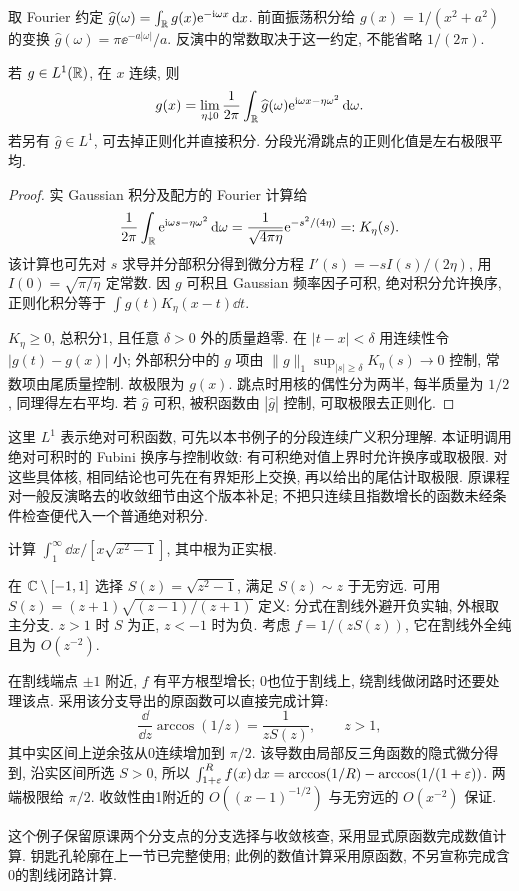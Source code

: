 取 Fourier 约定 $\widehat g(\omega)=\int_\mathbb R g(x)\mathrm e^{-\mathrm i\omega x}\,\mathrm d x$. 前面振荡积分给 $g(x)=1/(x^2+a^2)$ 的变换 $\widehat g(\omega)=\pi\ee^{-a|\omega|}/a$. 反演中的常数取决于这一约定, 不能省略 $1/(2\pi)$.
\begin{theorem}\label{thm:fourier}
若 $g\in L^1(\mathbb R)$, 在 $x$ 连续, 则
\[
g(x)=\lim_{\eta\downarrow0}\frac1{2\pi}\int_\mathbb R\widehat g(\omega)\mathrm e^{\mathrm i\omega x-\eta\omega^2}\,\mathrm d\omega.
\]
若另有 $\widehat g\in L^1$, 可去掉正则化并直接积分. 分段光滑跳点的正则化值是左右极限平均.
\end{theorem}
\begin{proof}
实 Gaussian 积分及配方的 Fourier 计算给
\[
\frac1{2\pi}\int_\mathbb R\mathrm e^{\mathrm i\omega s-\eta\omega^2}\,\mathrm d\omega
 =\frac1{\sqrt{4\pi\eta}}\mathrm e^{-s^2/(4\eta)}=:K_\eta(s).
\]
该计算也可先对 $s$ 求导并分部积分得到微分方程 $I'(s)=-sI(s)/(2\eta)$, 用 $I(0)=\sqrt{\pi/\eta}$ 定常数. 因 $g$ 可积且 Gaussian 频率因子可积, 绝对积分允许换序, 正则化积分等于 $\int g(t)K_\eta(x-t)\dd t$.

$K_\eta\ge0$, 总积分1, 且任意 $\delta>0$ 外的质量趋零. 在 $|t-x|<\delta$ 用连续性令 $|g(t)-g(x)|$ 小; 外部积分中的 $g$ 项由 $\|g\|_1\sup_{|s|\ge\delta}K_\eta(s)\to0$ 控制, 常数项由尾质量控制. 故极限为 $g(x)$. 跳点时用核的偶性分为两半, 每半质量为 $1/2$, 同理得左右平均. 若 $\widehat g$ 可积, 被积函数由 $|\widehat g|$ 控制, 可取极限去正则化.
\end{proof}
这里 $L^1$ 表示绝对可积函数, 可先以本书例子的分段连续广义积分理解. 本证明调用绝对可积时的 Fubini 换序与控制收敛: 有可积绝对值上界时允许换序或取极限. 对这些具体核, 相同结论也可先在有界矩形上交换, 再以给出的尾估计取极限. 原课程对一般反演略去的收敛细节由这个版本补足; 不把只连续且指数增长的函数未经条件检查便代入一个普通绝对积分.

\begin{example}
计算 $\int_1^\infty\dd x/[x\sqrt{x^2-1}]$, 其中根为正实根.
\end{example}
\begin{solution}
在 $\mathbb C\setminus[-1,1]$ 选择 $S(z)=\sqrt{z^2-1}$, 满足 $S(z)\sim z$ 于无穷远. 可用 $S(z)=(z+1)\sqrt{(z-1)/(z+1)}$ 定义: 分式在割线外避开负实轴, 外根取主分支. $z>1$ 时 $S$ 为正, $z<-1$ 时为负. 考虑 $f=1/(zS(z))$, 它在割线外全纯且为 $O(z^{-2})$.

在割线端点 $\pm1$ 附近, $f$ 有平方根型增长; 0也位于割线上, 绕割线做闭路时还要处理该点. 采用该分支导出的原函数可以直接完成计算:
\[
\frac{\dd}{\dd z}\arccos(1/z)=\frac1{zS(z)},\qquad z>1,
\]
其中实区间上逆余弦从0连续增加到 $\pi/2$. 该导数由局部反三角函数的隐式微分得到, 沿实区间所选 $S>0$, 所以 $\int_{1+\varepsilon}^R f(x)\,\mathrm d x=\arccos(1/R)-\arccos(1/(1+\varepsilon))$. 两端极限给 $\pi/2$. 收敛性由1附近的 $O((x-1)^{-1/2})$ 与无穷远的 $O(x^{-2})$ 保证.
\end{solution}
这个例子保留原课两个分支点的分支选择与收敛核查, 采用显式原函数完成数值计算. 钥匙孔轮廓在上一节已完整使用; 此例的数值计算采用原函数, 不另宣称完成含0的割线闭路计算.

